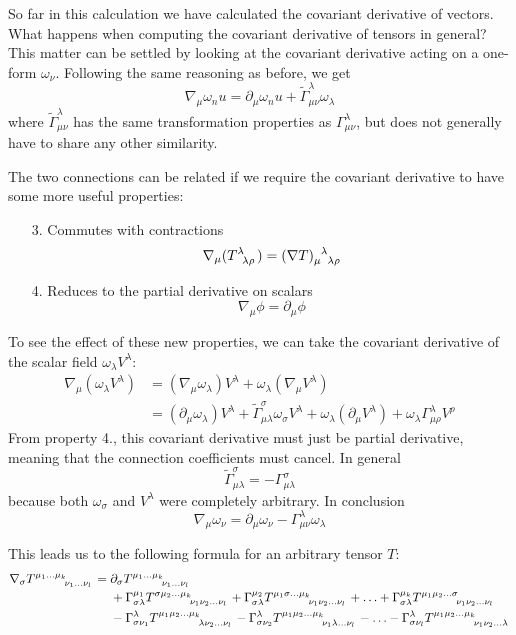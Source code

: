 So far in this calculation we have calculated the covariant derivative of vectors. What happens when computing the covariant derivative of tensors in general? This matter can be settled by looking at the covariant derivative acting on a one-form $\omega_\nu$. Following the same reasoning as before, we get
\[ \nabla_\mu\omega_nu = \partial_\mu\omega_nu + \tilde{\Gamma}^\lambda_{\mu\nu}\omega_\lambda \]
where $\tilde{\Gamma}^\lambda_{\mu\nu}$ has the same transformation properties as $\Gamma^\lambda_{\mu\nu}$, but does not generally have to share any other similarity.

The two connections can be related if we require the covariant derivative to have some more useful properties:
\begin{enumerate}
\item[3.] Commutes with contractions
\[ \nabla_\mu(\tensor{T}{^\lambda_\lambda_\rho}) = \tensor{(\nabla T)}{_\mu^\lambda_\lambda_\rho} \]
\item[4.] Reduces to the partial derivative on scalars
\[ \nabla_\mu\phi = \partial_\mu\phi \]
\end{enumerate}

To see the effect of these new properties, we can take the covariant derivative of the scalar field $\omega_\lambda V^\lambda$:
\begin{align}
\nabla_\mu(\omega_\lambda V^\lambda) &= (\nabla_\mu \omega_\lambda)V^\lambda + \omega_\lambda(\nabla_\mu V^\lambda) \\
&= (\partial_\mu\omega_\lambda)V^\lambda + \tilde{\Gamma}^\sigma_{\mu\lambda}\omega_\sigma V^\lambda + \omega_\lambda(\partial_\mu V^\lambda) + \omega_\lambda\Gamma^\lambda_{\mu\rho}V^\rho
\end{align}
From property 4., this covariant derivative must just be partial derivative, meaning that the connection coefficients must cancel. In general
\[ \tilde{\Gamma}^\sigma_{\mu\lambda} = - \Gamma^\sigma_{\mu\lambda} \]
because both $\omega_\sigma$ and $V^\lambda$ were completely arbitrary. In conclusion
\[ \nabla_\mu\omega_\nu = \partial_\mu\omega_\nu - \Gamma^\lambda_{\mu\nu}\omega_\lambda \]

This leads us to the following formula for an arbitrary tensor $T$:
\begin{align}
\nabla_\sigma \tensor{T}{^{\mu_1\ldots\mu_k}_{\nu_1\ldots\nu_l}} = {}&\partial_\sigma \tensor{T}{^{\mu_1\ldots\mu_k}_{\nu_1\ldots\nu_l}} \\
&+ \Gamma^{\mu_1}_{\sigma\lambda}\tensor{T}{^{\sigma\mu_2\ldots\mu_k}_{\nu_1\nu_2\ldots\nu_l}} + \Gamma^{\mu_2}_{\sigma\lambda}\tensor{T}{^{\mu_1\sigma\ldots\mu_k}_{\nu_1\nu_2\ldots\nu_l}} + \ldots + \Gamma^{\mu_k}_{\sigma\lambda}\tensor{T}{^{\mu_1\mu_2\ldots\sigma}_{\nu_1\nu_2\ldots\nu_l}} \\
&- \Gamma^{\lambda}_{\sigma\nu_1}\tensor{T}{^{\mu_1\mu_2\ldots\mu_k}_{\lambda\nu_2\ldots\nu_l}} - \Gamma^{\lambda}_{\sigma\nu_2}\tensor{T}{^{\mu_1\mu_2\ldots\mu_k}_{\nu_1\lambda\ldots\nu_l}} - \ldots - \Gamma^{\lambda}_{\sigma\nu_l}\tensor{T}{^{\mu_1\mu_2\ldots\mu_k}_{\nu_1\nu_2\ldots\lambda}}
\end{align}

